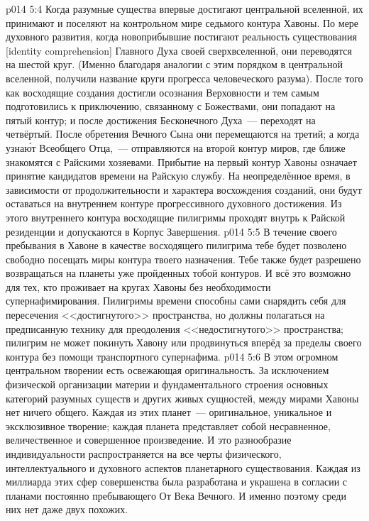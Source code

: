 \vs p014 5:4 \pc Когда разумные существа впервые достигают центральной вселенной, их принимают и поселяют на контрольном мире седьмого контура Хавоны. По мере духовного развития, когда новоприбывшие постигают реальность существования [identity comprehension] Главного Духа своей сверхвселенной, они переводятся на шестой круг. (Именно благодаря аналогии с этим порядком в центральной вселенной, получили название круги прогресса человеческого разума). После того как восходящие создания достигли осознания Верховности и тем самым подготовились к приключению, связанному с Божествами, они попадают на пятый контур; и после достижения Бесконечного Духа~--- переходят на четвёртый. После обретения Вечного Сына они перемещаются на третий; а когда узна\'ют Всеобщего Отца,~--- отправляются на второй контур миров, где ближе знакомятся с Райскими хозяевами. Прибытие на первый контур Хавоны означает принятие кандидатов времени на Райскую службу. На неопределённое время, в зависимости от продолжительности и характера восхождения созданий, они будут оставаться на внутреннем контуре прогрессивного духовного достижения. Из этого внутреннего контура восходящие пилигримы проходят внутрь к Райской резиденции и допускаются в Корпус Завершения.
\vs p014 5:5 В течение своего пребывания в Хавоне в качестве восходящего пилигрима тебе будет позволено свободно посещать миры контура твоего назначения. Тебе также будет разрешено возвращаться на планеты уже пройденных тобой контуров. И всё это возможно для тех, кто проживает на кругах Хавоны без необходимости супернафимирования. Пилигримы времени способны сами снарядить себя для пересечения <<достигнутого>> пространства, но должны полагаться на предписанную технику для преодоления <<недостигнутого>> пространства; пилигрим не может покинуть Хавону или продвинуться вперёд за пределы своего контура без помощи транспортного супернафима.
\vs p014 5:6 \pc В этом огромном центральном творении есть освежающая оригинальность. За исключением физической организации материи и фундаментального строения основных категорий разумных существ и других живых сущностей, между мирами Хавоны нет ничего общего. Каждая из этих планет~--- оригинальное, уникальное и эксклюзивное творение; каждая планета представляет собой несравненное, величественное и совершенное произведение. И это разнообразие индивидуальности распространяется на все черты физического, интеллектуального и духовного аспектов планетарного существования. Каждая из миллиарда этих сфер совершенства была разработана и украшена в согласии с планами постоянно пребывающего От Века Вечного. И именно поэтому среди них нет даже двух похожих.
